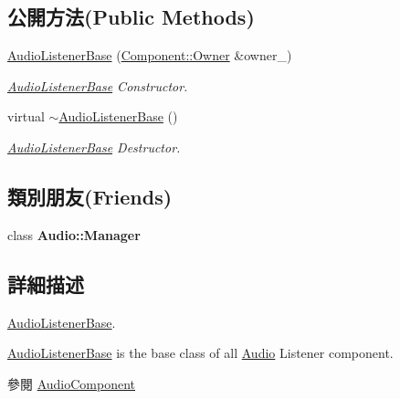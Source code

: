 \subsection*{公開方法(Public Methods)}
\begin{DoxyCompactItemize}
\item 
\hyperlink{class_magnum_1_1_audio_listener_base_ada07dfbfb9e983366135c278d3655d0a}{Audio\+Listener\+Base} (\hyperlink{class_magnum_1_1_component_1_1_owner}{Component\+::\+Owner} \&owner\+\_\+)
\begin{DoxyCompactList}\small\item\em \hyperlink{class_magnum_1_1_audio_listener_base}{Audio\+Listener\+Base} Constructor. \end{DoxyCompactList}\item 
virtual \hyperlink{class_magnum_1_1_audio_listener_base_a8481bd840e88b15f34da95a5f1340149}{$\sim$\+Audio\+Listener\+Base} ()
\begin{DoxyCompactList}\small\item\em \hyperlink{class_magnum_1_1_audio_listener_base}{Audio\+Listener\+Base} Destructor. \end{DoxyCompactList}\end{DoxyCompactItemize}
\subsection*{類別朋友(Friends)}
\begin{DoxyCompactItemize}
\item 
class {\bfseries Audio\+::\+Manager}\hypertarget{class_magnum_1_1_audio_listener_base_a3ad7b469f47b268897de410969c1c7cd}{}\label{class_magnum_1_1_audio_listener_base_a3ad7b469f47b268897de410969c1c7cd}

\end{DoxyCompactItemize}


\subsection{詳細描述}
\hyperlink{class_magnum_1_1_audio_listener_base}{Audio\+Listener\+Base}. 

\hyperlink{class_magnum_1_1_audio_listener_base}{Audio\+Listener\+Base} is the base class of all \hyperlink{class_magnum_1_1_audio}{Audio} Listener component. \begin{DoxySeeAlso}{參閱}
\hyperlink{class_magnum_1_1_audio_component}{Audio\+Component} 
\end{DoxySeeAlso}


